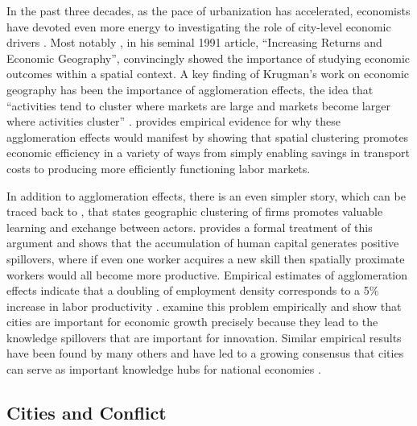 In the past three decades, as the pace of urbanization has accelerated, economists have devoted even more energy to investigating the role of city-level economic drivers \citep{lucas:1988, ciccone:hall:1996, begg:1999, henderson:wang:2007}. Most notably \citeauthor{krugman:1991a}, in his seminal 1991 article, ``Increasing Returns and Economic Geography'', convincingly showed the importance of studying economic outcomes within a spatial context. A key finding of Krugman's work on economic geography has been the importance of agglomeration effects, the idea that ``activities tend to cluster where markets are large and markets become larger where activities cluster'' \citep{krugman:1997}. \citet{henderson:2000} provides empirical evidence for why these agglomeration effects would manifest by showing that spatial clustering promotes economic efficiency in a variety of ways from simply enabling savings in transport costs to producing more efficiently functioning labor markets.

In addition to agglomeration effects, there is an even simpler story, which can be traced back to \citet{marshall:1920}, that states geographic clustering of firms promotes valuable learning and exchange between actors. \citet{lucas:1988} provides a formal treatment of this argument and shows that the accumulation of human capital generates positive spillovers, where if even one worker acquires a new skill then spatially proximate workers would all become more productive. Empirical estimates of agglomeration effects indicate that a doubling of employment density corresponds to a 5\% increase in labor productivity \citep{ciccone:hall:1996,ciccone:2002}. \citet{glaeser:etal:1992} examine this problem empirically and show that cities are important for economic growth precisely because they lead to the knowledge spillovers that are important for innovation. Similar empirical results have been found by many others and have led to a growing consensus that cities can serve as important knowledge hubs for national economies \citep{jaffe:etal:1993, glaeser:1994, firestone:2010}. 


\subsection{Cities and Conflict}

